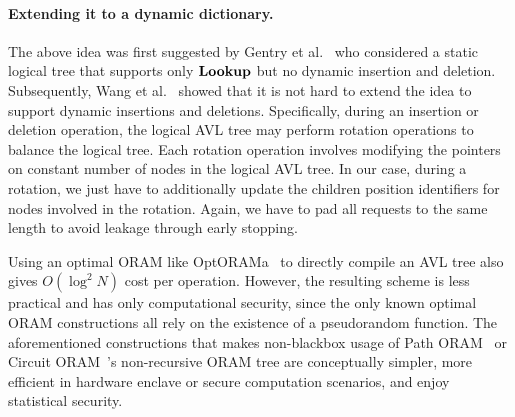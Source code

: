 \documentclass[11pt]{article}
\begin{document}
\paragraph{Extending it to a dynamic dictionary.}
The above idea was first suggested by Gentry et al.~\cite{gentryods}
who considered a static logical tree that supports
only ${\bf Lookup}$ but no dynamic insertion and deletion.  
Subsequently, Wang et al.~\cite{wang2014oblivious}
showed that it is not hard to extend the idea to support dynamic 
insertions and deletions.
Specifically, during an insertion or deletion operation, 
the logical AVL tree may perform rotation operations
to balance the logical tree.
Each rotation operation involves modifying the pointers
on constant number of nodes 
in the logical AVL tree. 
In our case, during a rotation, 
we just have to additionally
update the children position identifiers
for nodes involved in the rotation. 
Again, we have to pad all 
requests to the same length 
to avoid leakage through early stopping. 






\begin{remark}
Using an optimal ORAM like OptORAMa~\cite{optorama} 
to directly compile an AVL tree also gives $O(\log^2 N)$
cost per operation. 
However, the resulting scheme is less practical and has only computational
security, since the only known optimal ORAM constructions
all rely on the existence of a pseudorandom function.
The aforementioned constructions that makes non-blackbox usage of  
Path ORAM~\cite{stefanov2018path}
or Circuit ORAM~\cite{circuitoram}'s non-recursive ORAM tree 
are conceptually simpler, more efficient in hardware enclave
or secure computation scenarios, and 
enjoy statistical security.
\end{remark}
\end{document}

